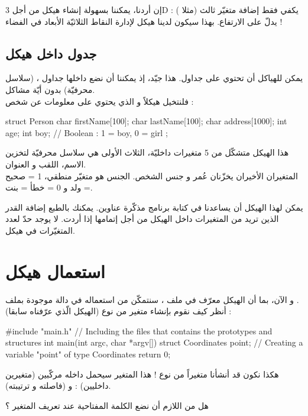 إن أردنا، يمكننا بسهولة إنشاء هيكل
من أجل
\textenglish{3D} :
يكفي فقط إضافة متغيّر ثالث (مثلا
)
يدلّ على الارتفاع. بهذا سيكون لدينا هيكل لإدارة النقاط الثلاثيّة الأبعاد في الفضاء !

\subsection{جدول داخل هيكل}

يمكن للهياكل أن تحتوي على جداول. هذا جيّد، إذ يمكننا أن نضع داخلها جداول
،
(سلاسل محرفيّة) بدون أيّة مشاكل.\\
فلنتخيل هيكلاً
و الذي يحتوي على معلومات عن شخص :

\begin{Csource}
struct Person
{
	char firstName[100];
	char lastName[100];
	char address[1000];
	int age;
	int boy; // Boolean : 1 = boy, 0 = girl
};
\end{Csource}

هذا الهيكل متشكّل من 5 متغيرات داخليّة، الثلاث الأولى هي سلاسل محرفيّة لتخزين الاسم، اللقب و العنوان.\\
المتغيران الأخيران يخزّنان عُمر و جنس الشخص. الجنس هو متغيّر منطقي، 1 = صحيح = ولد و 0 = خطأ = بنت.

يمكن لهذا الهيكل أن يساعدنا في كتابة برنامج مذكّرة عناوين. يمكنك بالطبع إضافة القدر الذين تريد من المتغيرات داخل الهيكل من أجل إتمامها إذا أردت. لا يوجد حدّ لعدد المتغيّرات في هيكل.

\section{استعمال هيكل}

و الآن، بما أن الهيكل معرّف في ملف
،
سنتمكّن من استعماله في دالة موجودة بملف
.\\
أنظر كيف نقوم بإنشاء متغير من نوع
(الهيكل الّذي عرّفناه سابقا) :
\begin{Csource}
#include "main.h" // Including the files that contains the prototypes and structures
int main(int argc, char *argv[])
{
	struct Coordinates point; // Creating a variable "point" of type Coordinates
	return 0;
}
\end{Csource}
هكذا نكون قد أنشأنا متغيراً
من نوع
 !
هذا المتغير سيحمل داخله مركّبين (متغيرين داخليين) :
و
(فاصلته و ترتيبته).

\begin{question}
  هل من اللازم أن نضع الكلمة المفتاحية
عند تعريف المتغير ؟
\end{question}

